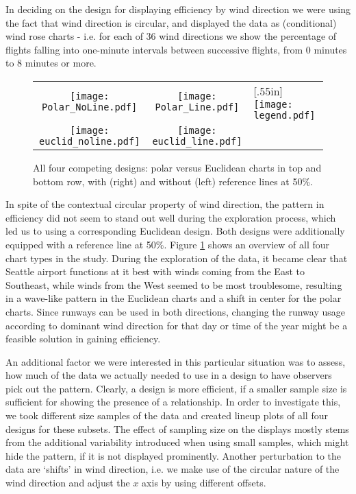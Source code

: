 In deciding on the design for displaying efficiency  by wind direction we were using the fact that wind direction is circular, and  displayed the data as (conditional) wind rose charts - i.e. for each of 36 wind directions we show the percentage of flights falling into one-minute intervals between successive flights, from  0 minutes to 8 minutes or more.

\begin{figure}[htbp] %
 \hspace{-.1in}
   \begin{tabular}{ccl}
   \texttt{[image: Polar\_NoLine.pdf]} &  \hspace{-.3in}
   \texttt{[image: Polar\_Line.pdf]}  &  \hspace{-.2in} \multirow{2}{*}[.55in]{  \texttt{[image: legend.pdf]}} \\
   \texttt{[image: euclid\_noline.pdf]} & \hspace{-.3in}
   \texttt{[image: euclid\_line.pdf]}
   \end{tabular}
   \caption{All four competing designs: polar versus Euclidean charts in top and bottom row, with (right) and without (left) reference lines at 50\%. }
   \label{layouts}
\end{figure}

In spite of the contextual circular property of wind direction, the pattern in efficiency did not seem to stand out well during the exploration process, which led us to using a corresponding  Euclidean design. Both designs were additionally equipped with a reference line at 50\%. 
Figure \ref{layouts} shows an overview of all four chart types in the study. During the exploration of the data, it became clear that Seattle airport functions at it best with winds coming from the East to Southeast, while winds from the West seemed to be most troublesome, resulting in a wave-like pattern in the Euclidean charts and a shift in center for the polar charts. Since runways can be used in both directions, changing the runway usage according to dominant wind direction for that day or time of the year might be a feasible solution in gaining efficiency. 

An additional factor we were interested in this particular situation was to assess, how much of the data we actually needed to use in a design to have observers pick out the pattern. Clearly, a design is more efficient, if a smaller sample size is sufficient for showing the presence of a relationship. In order to investigate this, we took different size samples of the data and created lineup plots of all four designs for these subsets. The effect of sampling size on the displays mostly stems from the additional variability introduced when using small samples, which might hide the pattern, if it is not displayed prominently. 
Another perturbation to the data are `shifts' in wind direction, i.e. we make use of the circular nature of the wind direction and adjust the $x$ axis by using different offsets.

